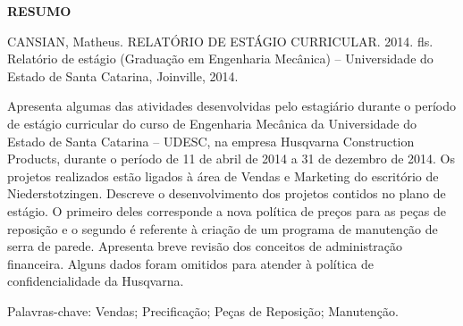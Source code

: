 \documentclass[12pt]{article}
\begin{document}
\onehalfspacing

\tableofcontents
\pagebreak

\listoffigures
\pagebreak

{
	\noindent
	
	\begin{center}
	{
		\bf RESUMO
	}\\[3cm]
	\end{center} 
	
	\begin{flushright}
	{
		CANSIAN, Matheus. RELATÓRIO DE ESTÁGIO CURRICULAR. 2014. \pageref{LastPage} fls. Relatório de estágio (Graduação em Engenharia Mecânica) – Universidade do Estado de Santa Catarina, Joinville, 2014. 
	}\\[2cm]
	\end{flushright}

	
	Apresenta algumas das atividades desenvolvidas pelo estagiário durante o período de estágio curricular do curso de Engenharia Mecânica da Universidade do Estado de Santa Catarina – UDESC, na empresa Husqvarna Construction Products, durante o período de 11 de abril de 2014 a 31 de dezembro de 2014. Os projetos realizados estão ligados à área de Vendas e Marketing do escritório de Niederstotzingen. Descreve o desenvolvimento dos projetos contidos no plano de estágio. O primeiro deles corresponde a nova política de preços para as peças de reposição e o segundo é referente à criação de um programa de manutenção de serra de parede. Apresenta breve revisão dos conceitos de administração financeira. Alguns dados foram omitidos para atender à política de confidencialidade da Husqvarna.
	
	\vfill

	{
		Palavras-chave: Vendas; Precificação; Peças de Reposição; Manutenção.
	}
}

\pagebreak
\end{document}
